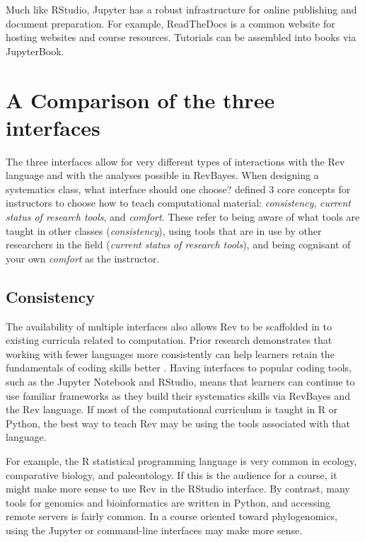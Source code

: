 \documentclass{article}
\begin{document}
Much like RStudio, Jupyter has a robust infrastructure for online publishing and document preparation.
For example, ReadTheDocs is a common website for hosting websites and course resources.
Tutorials can be assembled into books via JupyterBook.

\section{A Comparison of the three interfaces}

The three interfaces allow for very different types of interactions with the Rev language and with the analyses possible in RevBayes.
When designing a systematics class, what interface should one choose?
\cite{wright2019} defined 3 core concepts for instructors to choose how to teach computational material: \textit{consistency}, \textit{current status of research tools}, and \textit{comfort}. 
These refer to being aware of what tools are taught in other classes (\textit{consistency}), using tools that are in use by other researchers in the field (\textit{current status of research tools}), and being cognisant of your own \textit{comfort} as the instructor.

\subsection{Consistency}
The availability of multiple interfaces also allows Rev to be scaffolded in to existing curricula related to computation.
Prior research demonstrates that working with fewer languages more consistently can help learners retain the fundamentals of coding skills better \citep{guzman2019, wu1990}.
Having interfaces to popular coding tools, such as the Jupyter Notebook and RStudio, means that learners can continue to use familiar frameworks as they build their systematics skills via RevBayes and the Rev language.
If most of the computational curriculum is taught in R or Python, the best way to teach Rev may be using the tools associated with that language.

For example, the R statistical programming language is very common in ecology, comparative biology, and paleontology. 
If this is the audience for a course, it might make more sense to use Rev in the RStudio interface. 
By contrast, many tools for genomics and bioinformatics are written in Python, and accessing remote servers is fairly common.
In a course oriented toward phylogenomics, using the Jupyter or command-line interfaces may make more sense.
\end{document}
